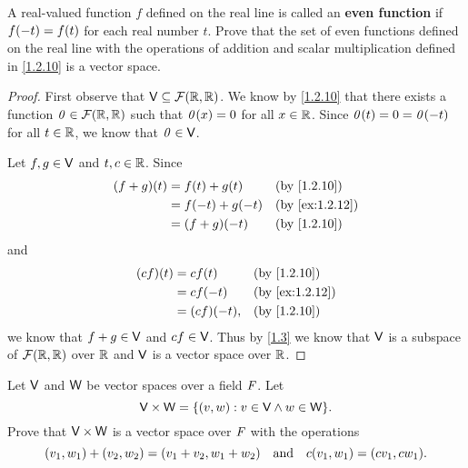 \begin{ex}\label{ex:1.2.12}
	A real-valued function \(f\) defined on the real line is called an \textbf{even function} if \(f\p{-t} = f\p{t}\) for each real number \(t\).
	Prove that the set of even functions defined on the real line with the operations of addition and scalar multiplication defined in \cref{1.2.10} is a vector space.
\end{ex}

\begin{proof}
	First observe that \(\V \subseteq \fs{\R}{\R}\).
	We know by \cref{1.2.10} that there exists a function \(\zv \in \fs{\R}{\R}\) such that \(\mathit{0}(x) = 0\) for all \(x \in \mathbb{R}\).
	Since \(\mathit{0}(t) = 0 = \mathit{0}(-t)\) for all \(t \in \mathbb{R}\), we know that \(\mathit{0} \in \mathsf{V}\).

	Let \(f, g \in \mathsf{V}\) and \(t, c \in \mathbb{R}\).
	Since
	\begin{align*}
		\p{f + g}\p{t} & = f\p{t} + g\p{t}   &  & \text{(by \cref{1.2.10})}    \\
		               & = f\p{-t} + g\p{-t} &  & \text{(by \cref{ex:1.2.12})} \\
		               & = \p{f + g}\p{-t}   &  & \text{(by \cref{1.2.10})}
	\end{align*}
	and
	\begin{align*}
		\p{cf}\p{t} & = cf\p{t}       &  & \text{(by \cref{1.2.10})}    \\
		            & = cf\p{-t}      &  & \text{(by \cref{ex:1.2.12})} \\
		            & = \p{cf}\p{-t}, &  & \text{(by \cref{1.2.10})}
	\end{align*}
	we know that \(f + g \in \mathsf{V}\) and \(cf \in \mathsf{V}\).
	Thus by \cref{1.3} we know that \(\mathsf{V}\) is a subspace of \(\fs{\R}{\R}\) over \(\mathbb{R}\) and \(\mathsf{V}\) is a vector space over \(\mathbb{R}\).
\end{proof}

\setcounter{ex}{20}
\begin{ex}\label{ex:1.2.21}
	Let \(\mathsf{V}\) and \(\mathsf{W}\) be vector spaces over a field \(\mathit{F}\).
	Let
	\[
		\V \times \W = \set{\p{v, w} : v \in \V \land w \in \W}.
	\]
	Prove that \(\mathsf{V} \times \mathsf{W}\) is a vector space over \(\mathit{F}\) with the operations
	\[
		\p{v_1, w_1} + \p{v_2, w_2} = \p{v_1 + v_2, w_1 + w_2} \quad \text{and} \quad c\p{v_1, w_1} = \p{cv_1, cw_1}.
	\]
\end{ex}

